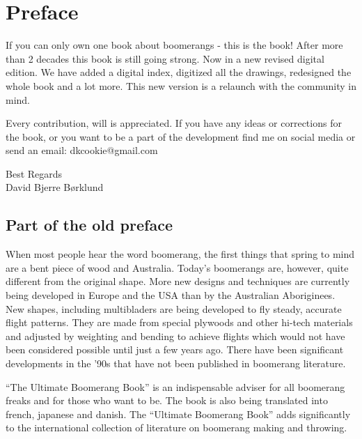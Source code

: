 \section*{Preface}
If you can only own one book about boomerangs - this is the book!
After more than 2 decades this book is still going strong. Now in a new revised digital edition. We have added a digital index, digitized all the drawings, redesigned the whole book and a lot more.
This new version is a relaunch with the community in mind.

Every contribution, will is appreciated. If you have any ideas or corrections for the book, or you want to be a part of the development find me on social media or send an email: dkcookie@gmail.com

Best Regards\\
David Bjerre Børklund\\

\subsection*{Part of the old preface}
When most people hear the word boomerang, the first things that spring to mind are a bent piece of wood and Australia. Today’s boomerangs are, however, quite different from the original shape. More new designs and techniques are currently being developed in Europe and the USA than by the Australian Aboriginees. New shapes, including multibladers are being developed to fly steady, accurate flight patterns. They are made from special plywoods and other hi-tech materials and adjusted by weighting and bending to achieve flights which would not have been considered possible until just a few years ago. There have been significant developments in the '90s that have not been published in boomerang literature.
\par
``The Ultimate Boomerang Book'' is an indispensable adviser for all boomerang freaks and for those who want to be. The book is also being translated into french, japanese and danish. The ``Ultimate Boomerang Book'' adds significantly to the international collection of literature on boomerang making and throwing.